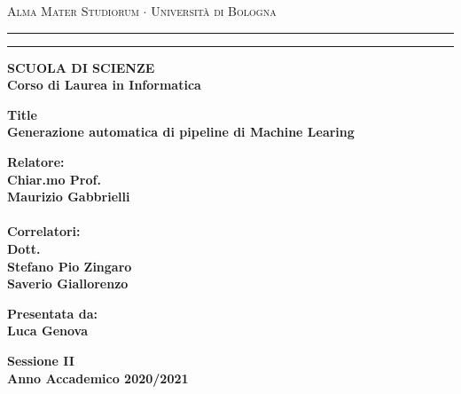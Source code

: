 \documentclass[12pt,a4paper]{report}
\begin{document}
\begin{titlepage}
\begin{center}
{{\Large{\textsc{Alma Mater Studiorum $\cdot$ Universit\`a di
Bologna}}}} \rule[0.1cm]{15.8cm}{0.1mm}
\rule[0.5cm]{15.8cm}{0.6mm}
{\small{\bf SCUOLA DI SCIENZE\\
Corso di Laurea in Informatica }}
\end{center}
\vspace{15mm}

\begin{center}
{\LARGE{\bf Title}}\\
\vspace{3mm}
{\LARGE{\bf Generazione automatica di pipeline di Machine Learing}}\\
\end{center}
\vspace{40mm}
\par
\noindent
\begin{minipage}[t]{0.47\textwidth}
{\large{\bf Relatore:\\
Chiar.mo Prof.\\
Maurizio Gabbrielli\\
\\
Correlatori:\\
Dott.\\
Stefano Pio Zingaro\\
Saverio Giallorenzo\\
}}
\end{minipage}
\hfill
\begin{minipage}[t]{0.47\textwidth}\raggedleft
{\large{\bf Presentata da:\\
Luca Genova}}
\end{minipage}
\vspace{20mm}
\begin{center}
{\large{\bf Sessione II\\%
Anno Accademico 2020/2021}}%
\end{center}
\end{titlepage}

\tableofcontents
\end{document}
